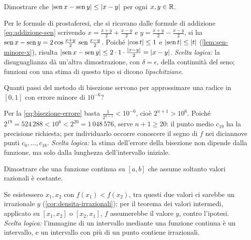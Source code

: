 \begin{esercizio}\label{es:seno-lipschitz}
Dimostrare che $\lvert \operatorname{sen} x-\operatorname{sen} y\rvert\le\lvert x-y\rvert$ per ogni $x,y\in\mathbb{R}$.
\begin{soluzione}
Per le formule di prostaferesi, che si ricavano dalle formule di addizione
\eqref{eq:addizione-sen} scrivendo $x=\frac{x+y}2+\frac{x-y}2$ e
$y=\frac{x+y}2-\frac{x-y}2$, si ha
$\operatorname{sen} x-\operatorname{sen} y=2\cos\frac{x+y}2\,\operatorname{sen}\frac{x-y}2$. Poiché $\lvert \cos t\rvert\le1$ e
$\lvert \operatorname{sen} t\rvert\le\lvert t\rvert$ (\cref{lem:sen-minore-x}), risulta
$\lvert \operatorname{sen} x-\operatorname{sen} y\rvert\le2\cdot1\cdot\frac{\lvert x-y\rvert}2=\lvert x-y\rvert$. \emph{Scelta logica:}
la disuguaglianza dà un'altra dimostrazione, con $\delta=\epsilon$, della continuità del
seno; funzioni con una stima di questo tipo si dicono \emph{lipschitziane}.
\end{soluzione}
\end{esercizio}

\begin{esercizio}
Quanti passi del metodo di bisezione servono per approssimare una radice in $[0,1]$
con errore minore di $10^{-6}$?
\begin{soluzione}
Per la \eqref{eq:bisezione-errore} basta $\frac1{2^{n+1}}<10^{-6}$, cioè
$2^{n+1}>10^{6}$. Poiché $2^{19}=524\,288<10^{6}<2^{20}=1\,048\,576$, serve $n+1\ge20$:
il punto medio $c_{19}$ ha la precisione richiesta; per individuarlo occorre conoscere
il segno di $f$ nei diciannove punti $c_{0},\dots,c_{18}$. \emph{Scelta logica:} la
stima dell'errore della bisezione non dipende dalla funzione, ma solo dalla lunghezza
dell'intervallo iniziale.
\end{soluzione}
\end{esercizio}

\begin{esercizio}
Dimostrare che una funzione continua su $[a,b]$ che assume soltanto valori razionali è
costante.
\begin{soluzione}
Se esistessero $x_{1},x_{2}$ con $f(x_{1})<f(x_{2})$, tra questi due valori ci sarebbe un
irrazionale $y$ (\cref{cor:densita-irrazionali}); per il teorema dei valori intermedi,
applicato su $[x_{1},x_{2}]$ o $[x_{2},x_{1}]$, $f$ assumerebbe il valore $y$, contro
l'ipotesi. \emph{Scelta logica:} l'immagine di un intervallo mediante una funzione
continua è un intervallo, e un intervallo con più di un punto contiene irrazionali.
\end{soluzione}
\end{esercizio}

